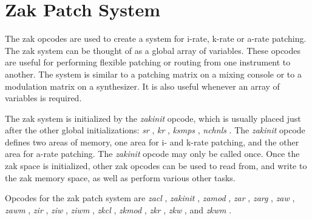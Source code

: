 \begin{comment}
\documentclass[10pt]{article}
\usepackage{fullpage, graphicx, url}
\setlength{\parskip}{1ex}
\setlength{\parindent}{0ex}
\title{Zak Patch System}



\begin{tabular}{ccc}
The Alternative Csound Reference Manual & & \\
Previous & &Next

\end{tabular}

\end{comment}
\section{Zak Patch System}


  The zak opcodes are used to create a system for i-rate, k-rate or a-rate patching. The zak system can be thought of as a global array of variables. These opcodes are useful for performing flexible patching or routing from one instrument to another. The system is similar to a patching matrix on a mixing console or to a modulation matrix on a synthesizer. It is also useful whenever an array of variables is required. 


  The zak system is initialized by the \emph{zakinit}
 opcode, which is usually placed just after the other global initializations: \emph{sr}
, \emph{kr}
, \emph{ksmps}
, \emph{nchnls}
. The \emph{zakinit}
 opcode defines two areas of memory, one area for i- and k-rate patching, and the other area for a-rate patching. The \emph{zakinit}
 opcode may only be called once. Once the zak space is initialized, other zak opcodes can be used to read from, and write to the zak memory space, as well as perform various other tasks. 


  Opcodes for the zak patch system are \emph{zacl}
, \emph{zakinit}
, \emph{zamod}
, \emph{zar}
, \emph{zarg}
, \emph{zaw}
, \emph{zawm}
, \emph{zir}
, \emph{ziw}
, \emph{ziwm}
, \emph{zkcl}
, \emph{zkmod}
, \emph{zkr}
, \emph{zkw}
, and \emph{zkwm}
. 


\begin{comment}
\begin{tabular}{lcr}
Previous &Home &Next \\
Tools for Real-time Spectral Processing &Up &The Standard Numeric Score

\end{tabular}



\end{comment}
